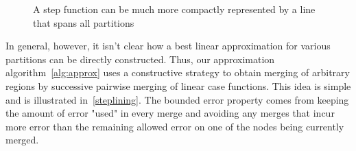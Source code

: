 \begin{figure}[!h]
\centering
\begin{minipage}{.3\textwidth}
  \centering
\end{minipage}
\begin{minipage}{.3\textwidth}
\centering
{}
\end{minipage}
\caption{A step function can be much more compactly represented by a line that spans all partitions}
 \label{steppair1}
\end{figure}

In general, however, it isn't clear how a best linear approximation for various partitions can be directly constructed. Thus, our approximation algorithm~\ref{alg:approx} uses a constructive strategy to obtain merging of arbitrary regions by successive pairwise merging of linear case functions. This idea is simple and is illustrated in~\ref{steplining}. The bounded error property comes from keeping the amount of error "used" in every merge and avoiding any merges that incur more error than the remaining allowed error on one of the nodes being currently merged.

